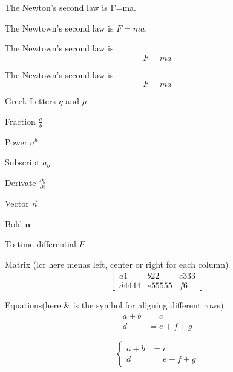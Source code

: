 \documentclass{article}
\begin{document}
    The Newton's second law is F=ma.

    The Newtown's second law is $F=ma$.

    The Newtown's second law is 
    $$F=ma$$

    The Newtown's second law is 
    \[F=ma\]

    Greek Letters $\eta$ and $\mu$

    Fraction $\frac{a}{b}$

    Power $a^b$

    Subscript $a_b$

    Derivate $\frac{\partial y}{\partial t}$

    Vector $\vec{n}$

    Bold $\mathbf{n}$

    To time differential $\dot{F}$

    Matrix (lcr here menas left, center or right for each column)
    \[
        \left[
            \begin{array}{lcr}
                a1 & b22 & c333 \\
                d4444 & e55555 & f6
            \end{array}
        \right]
    \]


    Equations(here \& is the symbol for aligning different rows)
    \begin{align}
        a+b&=c\\
        d&=e+f+g
    \end{align}

    \[
        \left\{
            \begin{aligned}
                a+b&=c\\
                d&=e+f+g
            \end{aligned}
        \right.    
    \]
    
\end{document}
